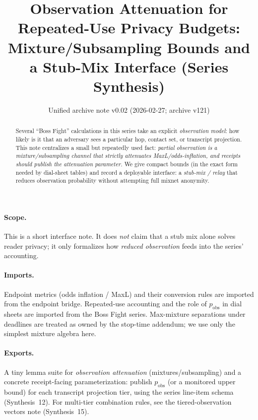 \documentclass[11pt]{article}
\title{Observation Attenuation for Repeated-Use Privacy Budgets:\\
\large Mixture/Subsampling Bounds and a Stub-Mix Interface (Series Synthesis)}
\author{}
\date{Unified archive note v0.02 (2026-02-27; archive v121)}
\theoremstyle{definition}
\begin{document}
\maketitle

\begin{abstract}
Several ``Boss Fight'' calculations in this series take an explicit \emph{observation model}: how likely is it that an adversary sees a particular hop, contact set, or transcript projection.
This note centralizes a small but repeatedly used fact:
\emph{partial observation is a mixture/subsampling channel that strictly attenuates MaxL/odds-inflation, and receipts should publish the attenuation parameter.}
We give compact bounds (in the exact form needed by dial-sheet tables) and record a deployable interface: a \emph{stub-mix / relay} that reduces observation probability without attempting full mixnet anonymity.
\end{abstract}

\paragraph{Scope.}
This is a short interface note.
It does \emph{not} claim that a stub mix alone solves reader privacy; it only formalizes how \emph{reduced observation} feeds into the series' accounting.

\paragraph{Imports.}
Endpoint metrics (odds inflation / MaxL) and their conversion rules are imported from the endpoint bridge.\cite{series:endpointbridge}
Repeated-use accounting and the role of $p_{\mathrm{obs}}$ in dial sheets are imported from the Boss Fight series.\cite{series:bossfightB}
Max-mixture separations under deadlines are treated as owned by the stop-time addendum; we use only the simplest mixture algebra here.\cite{series:stoptimeaddendum}

\paragraph{Exports.}
A tiny lemma suite for \emph{observation attenuation} (mixtures/subsampling) and a concrete receipt-facing parameterization: publish $p_{\mathrm{obs}}$ (or a monitored upper bound) for each transcript projection tier, using the series line-item schema (Synthesis~12). For multi-tier combination rules, see the tiered-observation vectors note (Synthesis~15).\cite{series:receiptitems,series:tieredobs}
\end{document}
